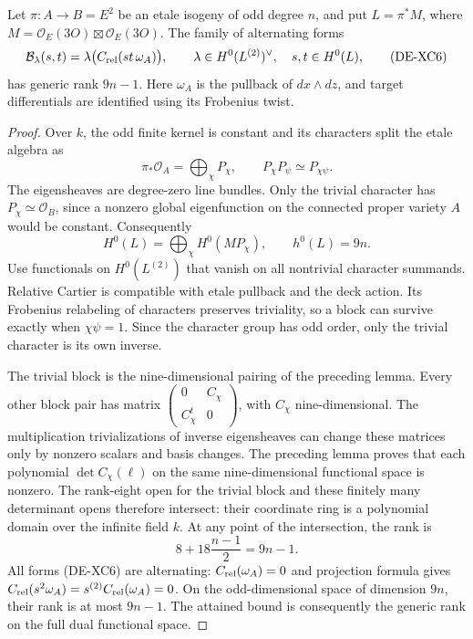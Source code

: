 \begin{theorem}
\label{thm:DE-SS-odd-pullback-dual-rank}
Let \(\pi:A\to B=E^2\) be an etale isogeny of odd degree
\(n\), and put \(L=\pi^*M\), where \(M=\mathcal O_E(3O)
\boxtimes\mathcal O_E(3O)\). The family of alternating forms
\[
 \mathcal B_\lambda(s,t)=
 \lambda\bigl(C_{\rm rel}(st\,\omega_A)\bigr),\qquad
 \lambda\in H^0(L^{(2)})^\vee,
 \quad s,t\in H^0(L),                                \tag{DE-XC6}
\]
has generic rank \(9n-1\). Here \(\omega_A\) is the
pullback of \(dx\wedge dz\), and target differentials are
identified using its Frobenius twist.
\end{theorem}
\begin{proof}
Over \(k\), the odd finite kernel is constant and its characters
split the etale algebra as
\[
 \pi_*\mathcal O_A=\bigoplus_{\chi}P_\chi,
 \qquad P_\chi P_\psi\simeq P_{\chi\psi}.
\]
The eigensheaves are degree-zero line bundles. Only the trivial
character has \(P_\chi\simeq\mathcal O_B\), since a nonzero
global eigenfunction on the connected proper variety \(A\)
would be constant. Consequently
\[
 H^0(L)=\bigoplus_\chi H^0(MP_\chi),\qquad h^0(L)=9n.
\]
Use functionals on \(H^0(L^{(2)})\) that vanish on all
nontrivial character summands. Relative Cartier is compatible
with etale pullback and the deck action. Its Frobenius relabeling
of characters preserves triviality, so a block can survive
exactly when \(\chi\psi=1\). Since the character group has
odd order, only the trivial character is its own inverse.

The trivial block is the nine-dimensional pairing of the
preceding lemma. Every other block pair has matrix
\(\left(\begin{smallmatrix}0&C_\chi\\C_\chi^t&0
\end{smallmatrix}\right)\), with \(C_\chi\) nine-dimensional.
The multiplication trivializations of inverse eigensheaves
can change these matrices only by nonzero scalars and basis
changes. The preceding lemma proves that each polynomial
\(\det C_\chi(\ell)\) on the same nine-dimensional functional
space is nonzero. The rank-eight open for the trivial block
and these finitely many determinant opens therefore intersect:
their coordinate ring is a polynomial domain over the infinite
field \(k\). At any point of the intersection, the rank is
\[
             8+18\frac{n-1}{2}=9n-1.
\]
All forms (DE-XC6) are alternating: \(C_{\rm rel}(\omega_A)=0\)
and projection formula gives
\(C_{\rm rel}(s^2\omega_A)=s^{(2)}C_{\rm rel}(\omega_A)=0\).
On the odd-dimensional space of dimension \(9n\), their rank
is at most \(9n-1\). The attained bound is consequently the
generic rank on the full dual functional space.
\end{proof}

